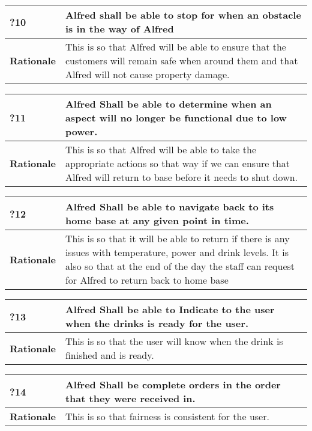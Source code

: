 \documentclass [11pt]{article}
\begin{document}
\begin{longtable}{| p{ } | p{ } | }\hline 
	\rowcolor{tableCell}\textbf{?10} & Alfred shall be able to stop for when an obstacle is in the way of Alfred \\ \hline
	\textbf{Rationale} &  This is so that Alfred will be able to ensure that the customers will remain safe when around them and that Alfred will not cause property damage.\\ \hline 
\end{longtable}


\begin{longtable}{| p{ } | p{ } | }\hline 
	\rowcolor{tableCell}\textbf{?11} & Alfred Shall be able to determine when an aspect will no longer be functional due to low power. \\ \hline
	\textbf{Rationale} &  This is so that Alfred will be able to take the appropriate actions so that way if we can ensure that Alfred will return to base before it needs to shut down.\\ \hline 
\end{longtable}

\begin{longtable}{| p{ } | p{ } | }\hline 
	\rowcolor{tableCell}\textbf{?12} & Alfred Shall be able to navigate back to its home base at any given point in time. \\ \hline
	\textbf{Rationale} &  This is so that it will be able to return if there is any issues with temperature, power and drink levels. It is also so that at the end of the day the staff can request for Alfred to return back to home base\\ \hline 
\end{longtable}

\begin{longtable}{| p{ } | p{ } | }\hline 
	\rowcolor{tableCell}\textbf{?13} & Alfred Shall be able to Indicate to the user when the drinks is ready for the user. \\ \hline
	\textbf{Rationale} &  This is so that the user will know when the drink is finished and is ready.\\ \hline 
\end{longtable}

\begin{longtable}{| p{ } | p{ } | }\hline 
	\rowcolor{tableCell}\textbf{?14} & Alfred Shall be complete orders in the order that they were received in. \\ \hline
	\textbf{Rationale} &  This is so that fairness is consistent for the user.\\ \hline 
\end{longtable}
\end{document}
